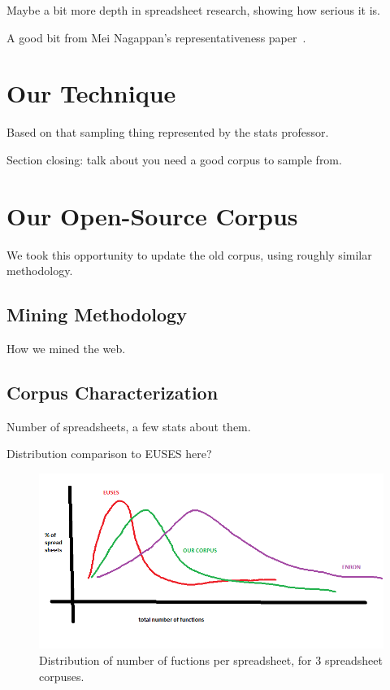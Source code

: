 \documentclass{sig-alternate} %
\begin{document}
Maybe a bit more depth in spreadsheet research, showing how serious it is.

A good bit from Mei Nagappan's representativeness paper~\cite{nag13}.

\section{Our Technique}

Based on that sampling thing represented by the stats professor.

Section closing: talk about you need a good corpus to sample from.

\section{Our Open-Source Corpus}

We took this opportunity to update the old corpus, using roughly similar
methodology.

\subsection{Mining Methodology}

How we mined the web.

\subsection{Corpus Characterization}

Number of spreadsheets, a few stats about them.

Distribution comparison to EUSES here?

\begin{figure}
\centering
\includegraphics[width=\columnwidth]{functions.png}
\caption{Distribution of number of fuctions per spreadsheet, for 3 spreadsheet corpuses.}
\label{fig:effectiveness}
\end{figure}
\end{document}
